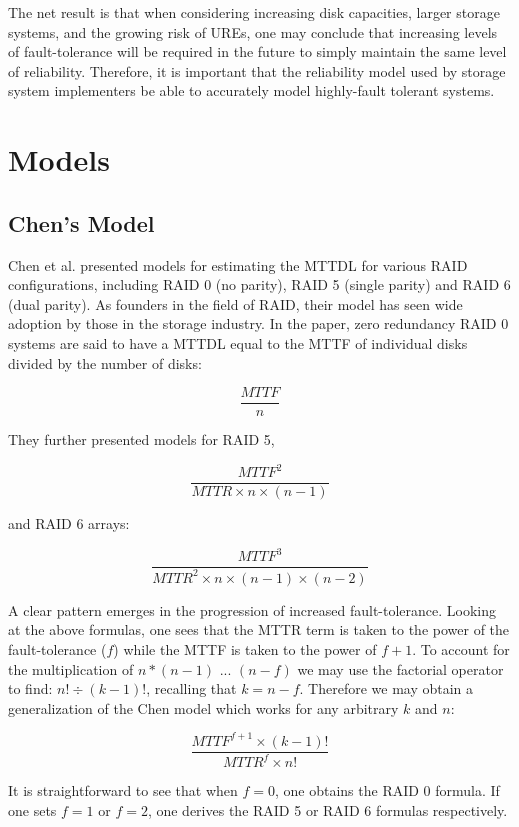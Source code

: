 \documentclass[XXX,endnotes]{usetex-v1}
\begin{document}
The net result is that when considering increasing disk capacities, larger storage systems, and the growing risk of UREs, one may conclude that increasing levels of fault-tolerance will be required in the future to simply maintain the same level of reliability.  Therefore, it is important that the reliability model used by storage system implementers be able to accurately model highly-fault tolerant systems. 

\section{Models}

\subsection{Chen's Model}

Chen et al. presented models for estimating the MTTDL for various RAID configurations\cite{reliability}, including RAID 0 (no parity), RAID 5 (single parity) and RAID 6 (dual parity).  As founders in the field of RAID, their model has seen wide adoption by those in the storage industry.  In the paper, zero redundancy RAID 0 systems are said to have a MTTDL equal to the MTTF of individual disks divided by the number of disks:

$$\frac{MTTF}{n}$$

They further presented models for RAID 5,

$$\frac{MTTF^{2}}{MTTR \times n \times (n-1)}$$

and RAID 6 arrays:

$$\frac{MTTF^{3}}{MTTR^{2} \times n \times (n-1) \times (n-2)}$$

A clear pattern emerges in the progression of increased fault-tolerance.  Looking at the above formulas, one sees that the MTTR term is taken to the power of the fault-tolerance ($f$) while the MTTF is taken to the power of $f+1$.  To account for the multiplication of $n * (n-1)$ ... $(n-f)$ we may use the factorial operator to find: $n! \div (k-1)!$, recalling that $k = n - f$.  Therefore we may obtain a generalization of the Chen model which works for any arbitrary $k$ and $n$:

$$\frac{MTTF^{f+1} \times (k-1)!}{MTTR^{f} \times n!}$$

It is straightforward to see that when $f = 0$, one obtains the RAID 0 formula.  If one sets $f = 1$ or $f = 2$, one derives the RAID 5 or RAID 6 formulas respectively.
\end{document}
